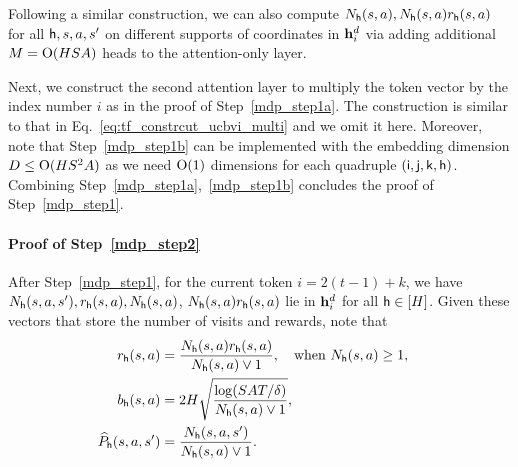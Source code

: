 Following a similar construction, we can also compute ${N}_{\mathsf{h}}({s},{a}),{N}_{\mathsf{h}}({s},{a}){r}_{\mathsf{h}}({s},{a})$ for all ${\mathsf{h}},{s},{a},{s}'$ on different supports of coordinates in ${\mathbf h}_i^{d}$ via adding additional ${M}={\mathrm{O}}({H}{S}{A})$ heads to the attention-only layer.


Next, we construct the second attention layer to multiply the token vector by the index number $i$ as in the proof of Step~\ref{mdp_step1a}. The construction is similar to that in Eq.~\eqref{eq:tf_constrcut_ucbvi_multi} and we omit it here. Moreover, note that Step~\ref{mdp_step1b} can be implemented with the embedding dimension $D\leq{\mathrm{O}}({H}{S}^2{A})$ as we need ${\mathrm{O}}(1)$ dimensions for each quadruple $({\mathsf{i}},{\mathsf{j}},{\mathsf{k}},{\mathsf{h}})$.  Combining Step~\ref{mdp_step1a},~\ref{mdp_step1b} concludes the proof of Step~\ref{mdp_step1}.










\paragraph{Proof of Step~\ref{mdp_step2}}
After Step~\ref{mdp_step1}, for the current token $i=2(t-1)+k$, we have ${N}_{\mathsf{h}}({s},{a},{s}'),{r}_{\mathsf{h}}({s},{a}),{N}_{\mathsf{h}}({s},{a})$, ${N}_{\mathsf{h}}({s},{a}){r}_{\mathsf{h}}({s},{a})$  lie in ${\mathbf h}_i^{d}$ for all ${\mathsf{h}}\in[{H}]$. Given these vectors that store the number of visits and rewards, note that
\begin{align*}
{r}_{\mathsf{h}}({s},{a})&=\frac{{N}_{\mathsf{h}}({s},{a}){r}_{\mathsf{h}}({s},{a})}{{N}_{\mathsf{h}}({s},{a})\vee1},~~\text{ when  } {N}_{\mathsf{h}}({s},{a})\geq1,~~~\\
{b}_{\mathsf{h}}({s},{a})
&=2{H}\sqrt{\frac{\log({S}{A}{T}/\delta)}{{N}_{\mathsf{h}}({s},{a})\vee1}},
\\
\widehat{P}_{\mathsf{h}}({s},{a},{s}')
&=\frac{{N}_{\mathsf{h}}({s},{a},{s}')}{{N}_{\mathsf{h}}({s},{a})\vee 1}.
\end{align*}

